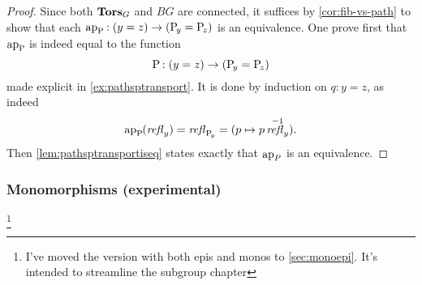 \begin{proof}
  Since both $\mathbf{Tors}_G$ and $BG$ are connected, it suffices by
  \cref{cor:fib-vs-path} to show that each
  $\mathop{\mathrm{ap}_{\mathrm{P}_{\!}}}:(y=z)\to(\mathrm{P}_{\!y}=\mathrm{P}_{\!z})$ is an
  equivalence. One prove first that $\mathop{\mathrm{ap}_{\mathrm{P}_{\!}}}$ is indeed equal
  to the function
  $$\mathrm{P}_{\!}:(y=z)\to(\mathrm{P}_{\!y}= \mathrm{P}_{\!z})$$
  made explicit in \cref{ex:pathsptransport}. It is done by induction
  on $q:y=z$, as indeed
  \begin{displaymath}
    \mathop{\mathrm{ap}_{\mathrm{P}_{\!}}}(\mathop{\mathit{refl}_{y}}) = \mathop{\mathit{refl}_{\mathrm{P}_{\!y}}} = (p\mapsto p\mathop{\mathit{refl}_{y}}^{-1}).
  \end{displaymath}
  Then \cref{lem:pathsptransportiseq} states exactly that $\mathop{\mathrm{ap}_{P}}$ is
  an equivalence.
%
%

\end{proof}

\subsubsection{Monomorphisms (experimental)}
\footnote{I've moved the version with both epis and monos to \cref{sec:monoepi}.  
  It's intended to streamline the subgroup chapter}


